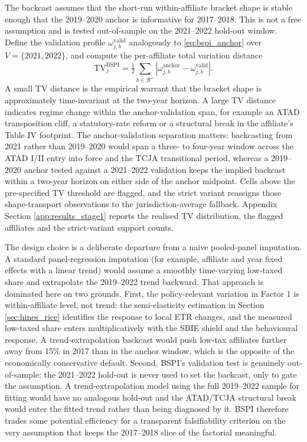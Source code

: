 \documentclass[11pt,a4paper]{article}
\begin{document}
The backcast assumes that the short-run within-affiliate bracket shape is stable enough that the 2019--2020 anchor is informative for 2017--2018. This is not a free assumption and is tested out-of-sample on the 2021--2022 hold-out window. Define the validation profile $\omega_{j,b}^{\text{valid}}$ analogously to \eqref{eq:bspi_anchor} over $V = \{2021, 2022\}$, and compute the per-affiliate total variation distance
\begin{equation}\label{eq:bspi_tv}
\text{TV}_{j}^{\text{BSPI}} = \tfrac{1}{2}\sum_{b \in \mathcal{B}^{+}}\left|\omega_{j,b}^{\text{anchor}} - \omega_{j,b}^{\text{valid}}\right|.
\end{equation}
A small TV distance is the empirical warrant that the bracket shape is approximately time-invariant at the two-year horizon. A large TV distance indicates regime change within the anchor-validation span, for example an ATAD transposition cliff, a statutory-rate reform or a structural break in the affiliate's Table IV footprint. The anchor-validation separation matters: backcasting from 2021 rather than 2019--2020 would span a three- to four-year window across the ATAD I/II entry into force and the TCJA transitional period, whereas a 2019--2020 anchor tested against a 2021--2022 validation keeps the implied backcast within a two-year horizon on either side of the anchor midpoint. Cells above the pre-specified TV threshold are flagged, and the strict variant reassigns those shape-transport observations to the jurisdiction-average fallback. Appendix Section \ref{app:results_stage1} reports the realised TV distribution, the flagged affiliates and the strict-variant support counts.

The design choice is a deliberate departure from a naive pooled-panel imputation. A standard panel-regression imputation (for example, affiliate and year fixed effects with a linear trend) would assume a smoothly time-varying low-taxed share and extrapolate the 2019--2022 trend backward. That approach is dominated here on two grounds. First, the policy-relevant variation in Factor 1 is within-affiliate level, not trend: the semi-elasticity estimation in Section \ref{sec:hines_rice} identifies the response to local ETR changes, and the measured low-taxed share enters multiplicatively with the SBIE shield and the behavioural response. A trend-extrapolation backcast would push low-tax affiliates further away from 15\% in 2017 than in the anchor window, which is the opposite of the economically conservative default. Second, BSPI's validation test is genuinely out-of-sample: the 2021--2022 hold-out is never used to set the backcast, only to gate the assumption. A trend-extrapolation model using the full 2019--2022 sample for fitting would have no analogous hold-out and the ATAD/TCJA structural break would enter the fitted trend rather than being diagnosed by it. BSPI therefore trades some potential efficiency for a transparent falsifiability criterion on the very assumption that keeps the 2017--2018 slice of the factorial meaningful.
\end{document}
